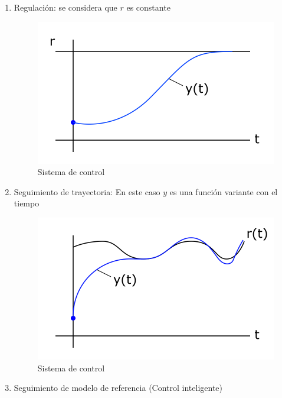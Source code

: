 \begin{enumerate}

    \item Regulación: se considera que \( r \) es constante
        \begin{figure}[h!]
            \centering
                \includegraphics[scale=0.25]{Control de Sistemas Mecatronicos Figuras/04 Regulacion.png}
            \caption{Sistema de control}
        \end{figure}
        
    \item Seguimiento de trayectoria: En este caso \( y \) es una función variante con el tiempo
        \begin{figure}[h!]
            \centering
                \includegraphics[scale=0.25]{Control de Sistemas Mecatronicos Figuras/05 Seguimiento de Trayectoria.png}
            \caption{Sistema de control}
        \end{figure}
        
    \item Seguimiento de modelo de referencia (Control inteligente)
\end{enumerate}

